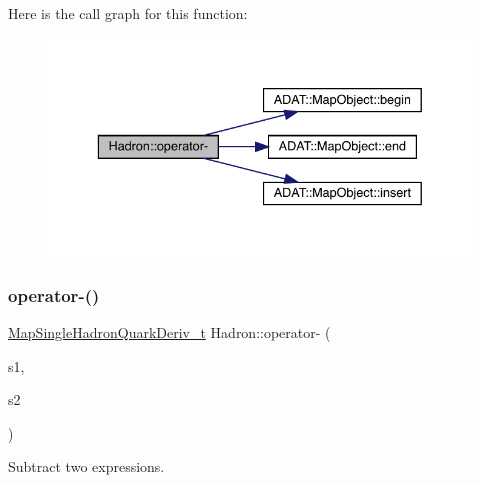 Here is the call graph for this function\+:
\nopagebreak
\begin{figure}[H]
\begin{center}
\leavevmode
\includegraphics[width=336pt]{d1/daf/namespaceHadron_a3420e25a6674cbce229ba6b98f1fa85a_cgraph}
\end{center}
\end{figure}
\mbox{\label{namespaceHadron_a064800b32b071a140c16ef8416cfa165}} 
\subsubsection{\texorpdfstring{operator-\/()}{operator-()}\hspace{0.1cm}{\footnotesize\ttfamily [4/6]}}
{\footnotesize\ttfamily \mbox{\hyperlink{namespaceHadron_aa588220689caea8a6aad4d0296526e6b}{Map\+Single\+Hadron\+Quark\+Deriv\+\_\+t}} Hadron\+::operator-\/ (\begin{DoxyParamCaption}\item[{const \mbox{\hyperlink{namespaceHadron_aa588220689caea8a6aad4d0296526e6b}{Map\+Single\+Hadron\+Quark\+Deriv\+\_\+t}} \&}]{s1,  }\item[{const \mbox{\hyperlink{namespaceHadron_aa588220689caea8a6aad4d0296526e6b}{Map\+Single\+Hadron\+Quark\+Deriv\+\_\+t}} \&}]{s2 }\end{DoxyParamCaption})}



Subtract two expressions. 

\mbox{\label{namespaceHadron_a2cee38a50a5e1ed5fbff1d9e4df08bdd}} 
